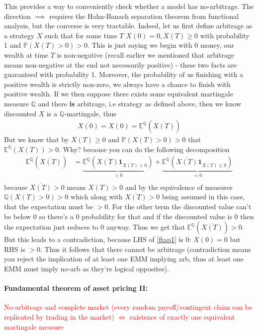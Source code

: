 \documentclass[9pt]{extarticle}
\begin{document}
This provides a way to conveniently check whether a model has no-arbitrage. The direction $\implies$ requires the Hahn-Banach separation theorem 
from functional analysis, but the converse is very tractable. Indeed, let us first define arbitrage as a strategy $X$ such that 
for some time $T$ $X(0)=0, X(T)\geq 0$ with probability 1 and $\mathbb{P}(X(T)>0)>0$. This is just saying we begin with 0 money, 
our wealth at time $T$ is non-negative (recall earlier we mentioned that arbitrage means non-negative at the end not necessarily positive) - 
these two facts are guaranteed with probability 1. Moreover, the probability of us finishing with a positive wealth is strictly non-zero, we always have a chance 
to finish with positive wealth. If we then suppose there exists some equivalent martingale measure $\mathbb{Q}$ and there \textbf{is} arbitrage, i.e strategy as defined above, then 
we know discounted $X$ is a $\mathbb{Q}$-martingale, thus 
\begin{align}\label{ftap1}
  \overline{X(0)} = X(0) = \mathbb{E}^{\mathbb{Q}}(\overline{X(T)}) 
\end{align}
But we know that by $X(T)\geq0$ and $\mathbb{P}(X(T)>0)>0$ that $\mathbb{E}^{\mathbb{Q}}(X(T))>0$. Why? because you can do the following decomposition
\begin{align*}
  \mathbb{E}^\mathbb{Q}(\overline{X(T)}) &= \underbrace{\mathbb{E}^\mathbb{Q}(\overline{X(T)}\mathbf{1}_{\overline{X(T)}>0})}_{>0} + \underbrace{\mathbb{E}^\mathbb{Q}(\overline{X(T)}\mathbf{1}_{\overline{X(T)}\leq 0})}_{=0} \\  
\end{align*}
because $\overline{X(T)}>0$ means $X(T)>0$ and by the equivalence of measures $\mathbb{Q}(X(T)>0)>0$ which along with $\overline{X(T)}>0$ being assumed in this 
case, that the expectation must be $>0$. For the other term the discounted value can't be below 0 so there's a 0 probability for that 
and if the discounted value is 0 then the expectation just reduces to 0 anyway. Thus we get that $  \mathbb{E}^\mathbb{Q}(\overline{X(T)}) >0$.
But this leads to a contradiction, because LHS of \eqref{ftap1} is 0: $X(0)=0$ 
but RHS is $>0$. Thus it follows that there cannot be arbitrage (contradiction means you reject the implication of at least one EMM implying arb, thus at least one EMM must 
imply no-arb as they're logical opposites).

\paragraph{Fundamental theorem of asset pricing II:} \textcolor{red}{No-arbitrage and complete market (every random payoff/contingent claim can be 
replicated by trading in the market) $\iff$ existence of exactly one equivalent martingale measure}
\end{document}

